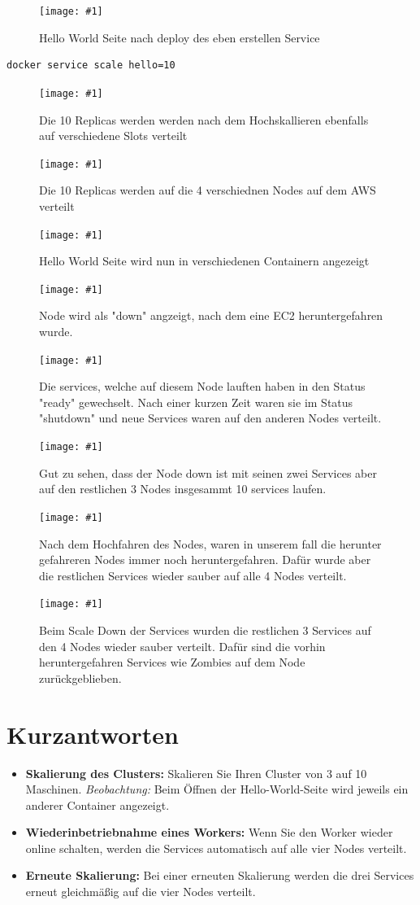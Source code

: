\documentclass[11pt,a4paper,twocolumn]{article}
\newcommand{\screenshot}[3]{%
  \begin{figure}[H]\centering
    \texttt{[image: \#1]}
    \caption{#2}\label{fig:#3}
  \end{figure}}
\begin{document}
\screenshot{hello_world.png}{Hello World Seite nach deploy des eben erstellen Service}{Hello World}

\begin{lstlisting}[language=bash]
docker service scale hello=10
\end{lstlisting}

\screenshot{10_replicas.png}{Die 10 Replicas werden werden nach dem Hochskallieren ebenfalls auf verschiedene Slots verteilt}{10 Replicas}
\screenshot{portainer_cluster_10rep.png}{Die 10 Replicas werden auf die 4 verschiednen Nodes auf dem AWS verteilt}{Verteilung 10 Replicas}

\screenshot{hello_world_two_containers.png}{Hello World Seite wird nun in verschiedenen Containern angezeigt}{Hello World 2 Container}

\screenshot{shutdown node.png}{Node wird als "down" angzeigt, nach dem eine EC2 heruntergefahren wurde.}{Shutdown Instance}

\screenshot{services_ready_status.png}{Die services, welche auf diesem Node lauften haben in den Status "ready" gewechselt. Nach einer kurzen Zeit waren sie im Status "shutdown" und neue Services waren auf den anderen Nodes verteilt.}{Status ready}
\screenshot{portainer_down_but10.png}{Gut zu sehen, dass der Node down ist mit seinen zwei Services aber auf den restlichen 3 Nodes insgesammt 10 services laufen.}{Node down but 10 services still running}

\screenshot{shutdown_services.png}{Nach dem Hochfahren des Nodes, waren in unserem fall die herunter gefahreren Nodes immer noch heruntergefahren. Dafür wurde aber die restlichen Services wieder sauber auf alle 4 Nodes verteilt.}{Still shutdown}

\screenshot{portainer_scale_down.png}{Beim Scale Down der Services wurden die restlichen 3 Services auf den 4 Nodes wieder sauber verteilt. Dafür sind die vorhin heruntergefahren Services wie Zombies auf dem Node zurückgeblieben.}{Scale down}
\section{Kurzantworten}
\begin{itemize}
  \item \textbf{Skalierung des Clusters:}  
  Skalieren Sie Ihren Cluster von 3 auf 10 Maschinen.  
  \textit{Beobachtung:} Beim Öffnen der Hello-World-Seite wird jeweils ein anderer Container angezeigt.

  \item \textbf{Wiederinbetriebnahme eines Workers:}  
  Wenn Sie den Worker wieder online schalten, werden die Services automatisch auf alle vier Nodes verteilt.

  \item \textbf{Erneute Skalierung:}  
  Bei einer erneuten Skalierung werden die drei Services erneut gleichmäßig auf die vier Nodes verteilt.
\end{itemize}
\end{document}
